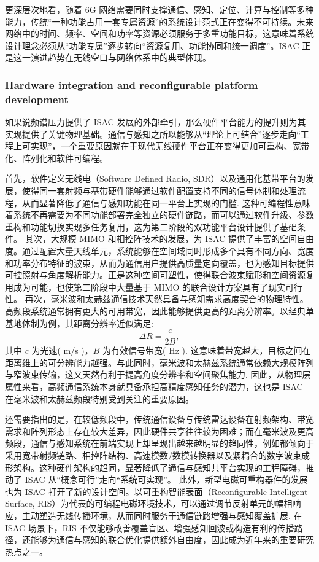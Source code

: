 更深层次地看，随着 6G 网络需要同时支撑通信、感知、定位、计算与控制等多种能力，传统“一种功能占用一套专属资源”的系统设计范式正在变得不可持续\cite{Gonzalez2024integrated,Saad2020Vision6G}。未来网络中的时间、频率、空间和功率等资源必须服务于多重功能目标，这意味着系统设计理念必须从“功能专属”逐步转向“资源复用、功能协同和统一调度”。ISAC 正是这一演进趋势在无线空口与网络体系中的典型体现。

\subsubsection{Hardware integration and reconfigurable platform development}
\label{subsubsec:ch1-driving-force-hardware}

如果说频谱压力提供了 ISAC 发展的外部牵引，那么硬件平台能力的提升则为其实现提供了关键物理基础。通信与感知之所以能够从“理论上可结合”逐步走向“工程上可实现”，一个重要原因就在于现代无线硬件平台正在变得更加可重构、宽带化、阵列化和软件可编程。

首先，软件定义无线电（Software Defined Radio, SDR）以及通用化基带平台的发展，使得同一套射频与基带硬件能够通过软件配置支持不同的信号体制和处理流程，从而显著降低了通信与感知功能在同一平台上实现的门槛\cite{Mitola1995SDR}. 这种可编程性意味着系统不再需要为不同功能部署完全独立的硬件链路，而可以通过软件升级、参数重构和功能切换实现多任务复用，这为第二阶段的双功能平台设计提供了基础条件。
其次，大规模 MIMO 和相控阵技术的发展，为 ISAC 提供了丰富的空间自由度。通过配置大量天线单元，系统能够在空间域同时形成多个具有不同方向、宽度和功率分布特征的波束，从而为通信用户提供高质量定向覆盖，也为感知目标提供可控照射与角度解析能力\cite{Liu2020JointRadarComm,Li2023integrated}。正是这种空间可塑性，使得联合波束赋形和空间资源复用成为可能，也使第二阶段中大量基于 MIMO 的联合设计方案具有了现实可行性。
再次，毫米波和太赫兹通信技术天然具备与感知需求高度契合的物理特性。高频段系统通常拥有更大的可用带宽，因此能够提供更高的距离分辨率。以经典单基地体制为例，其距离分辨率近似满足:
\[
\Delta R = \frac{c}{2B},
\]
其中 $c$ 为光速( m/s )，$B$ 为有效信号带宽( Hz )\cite{SkolnikRadarBook}. 这意味着带宽越大，目标之间在距离维上的可分辨能力越强。与此同时，毫米波和太赫兹系统通常依赖大规模阵列与窄波束传输，这又天然有利于提高角度分辨率和空间聚焦能力\cite{Rappaport2019WirelessTHz}. 因此，从物理层属性来看，高频通信系统本身就具备承担高精度感知任务的潜力，这也是 ISAC 在毫米波和太赫兹频段特别受到关注的重要原因。

还需要指出的是，在较低频段中，传统通信设备与传统雷达设备在射频架构、带宽需求和阵列形态上存在较大差异，因此硬件共享往往较为困难；而在毫米波及更高频段，通信与感知系统在前端实现上却呈现出越来越明显的趋同性，例如都倾向于采用宽带射频链路、相控阵结构、高速模数/数模转换器以及紧耦合的数字波束成形架构\cite{Liu2022ISAC,Rappaport2019WirelessTHz}。这种硬件架构的趋同，显著降低了通信与感知共平台实现的工程障碍，推动了 ISAC 从“概念可行”走向“系统可实现”。
此外，新型电磁可重构器件的发展也为 ISAC 打开了新的设计空间。以可重构智能表面（Reconfigurable Intelligent Surface, RIS）为代表的可编程电磁环境技术，可以通过调节反射单元的幅相响应，主动塑造无线传播环境，从而同时服务于通信链路增强与感知覆盖扩展\cite{Chepuri2023integrated}. 在 ISAC 场景下，RIS 不仅能够改善覆盖盲区、增强感知回波或构造有利的传播路径，还能够为通信与感知的联合优化提供额外自由度，因此成为近年来的重要研究热点之一。

